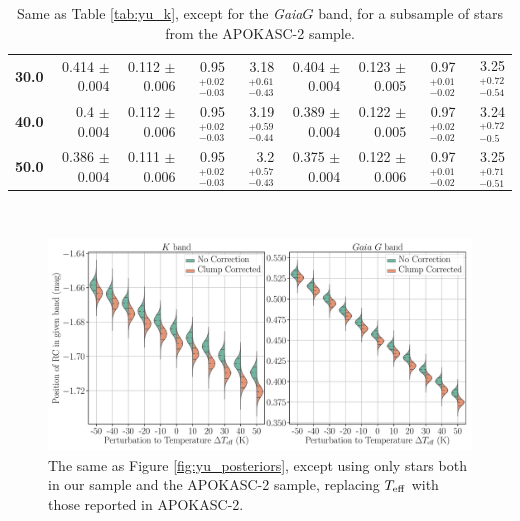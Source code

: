 \documentclass[fleqn,usenatbib]{mnras}
\newcommand{\teff}{\mbox{$T_{\rm eff}$}\xspace}
\newcommand{\gaia}{\emph{Gaia}\xspace}
\begin{document}
\begin{table}
\begin{tabular}{rrrrr|rrrr}
        \textbf{30.0 } &  0.414 $\pm$ 0.004 &  0.112 $\pm$ 0.006 &  0.95$_{-0.03}^{+0.02}$ &  3.18$_{-0.43}^{+0.61}$    &  0.404 $\pm$ 0.004 &   0.123 $\pm$ 0.005 &  0.97$_{-0.02}^{+0.01}$ &   3.25$_{-0.54}^{+0.72}$ \\
        \textbf{40.0 } &    0.4 $\pm$ 0.004 &  0.112 $\pm$ 0.006 &  0.95$_{-0.03}^{+0.02}$ &  3.19$_{-0.44}^{+0.59}$    &  0.389 $\pm$ 0.004 &   0.122 $\pm$ 0.005 &  0.97$_{-0.02}^{+0.02}$ &   3.24$_{- 0.5}^{+0.72}$ \\
        \textbf{50.0 } &  0.386 $\pm$ 0.004 &  0.111 $\pm$ 0.006 &  0.95$_{-0.03}^{+0.02}$ &   3.2$_{-0.43}^{+0.57}$    &  0.375 $\pm$ 0.004 &   0.122 $\pm$ 0.006 &  0.97$_{-0.02}^{+0.01}$ &   3.25$_{-0.51}^{+0.71}$ \\
    \bottomrule
    \end{tabular} \\
\caption{Same as Table \ref{tab:yu_k}, except for the \gaia $G$ band, for a subsample of stars from the APOKASC-2 \citep{art:pinsonneault+2018} sample.}
\label{tab:apo_g}
\end{table}

\begin{figure}
    \centering
    \includegraphics[width=\textwidth]{apokasc2_posteriors.pdf}
    \caption{The same as Figure \ref{fig:yu_posteriors}, except using only stars both in our sample and the APOKASC-2 \citep{art:pinsonneault+2018} sample, replacing \teff with those reported in APOKASC-2.}
    \label{fig:apokasc2_posteriors}    
\end{figure}
\end{document}
